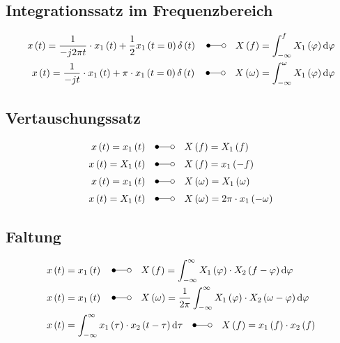 \subsection*{Integrationssatz im Frequenzbereich}
\begin{align*}
x\left(t\right) =\frac{1}{-j2\pi t}\cdot x_1\left(t\right)+\frac{1}{2}x_1\left(t=0\right)\delta\left(t\right) \quad \Laplace \quad X\left(f\right) =\int_{-\infty}^{f}X_1\left(\varphi\right)\diff \varphi\\
x\left(t\right) =\frac{1}{-j t}\cdot x_1\left(t\right)+\pi\cdot x_1\left(t=0\right)\delta\left(t\right) \quad \Laplace \quad X\left(\omega\right) =\int_{-\infty}^{\omega}X_1\left(\varphi\right)\diff \varphi
\end{align*}

\subsection*{Vertauschungssatz}
\begin{align*}
x\left(t\right) =x_1\left(t\right) \quad &\Laplace \quad X\left(f\right) =X_1\left(f\right)\\
x\left(t\right) =X_1\left(t\right) \quad &\Laplace \quad X\left(f\right) =x_1\left(-f\right)\\
x\left(t\right) =x_1\left(t\right) \quad &\Laplace \quad X\left(\omega\right)
=X_1\left(\omega\right)\\
x\left(t\right) =X_1\left(t\right) \quad &\Laplace \quad X\left(\omega\right) =2\pi\cdot
x_1\left(-\omega\right)
\end{align*}

\subsection*{Faltung}
\begin{align*}
&x\left(t\right) =x_1\left(t\right) \quad \Laplace \quad X\left(f\right) =\int_{-\infty}^\infty
X_1\left(\varphi\right)\cdot X_2\left(f-\varphi\right)\diff \varphi\\
&x\left(t\right) =x_1\left(t\right) \quad \Laplace \quad X\left(\omega\right)
=\frac{1}{2\pi}\int_{-\infty}^\infty X_1\left(\varphi\right)\cdot X_2\left(\omega-\varphi\right)\diff \varphi\\
&x\left(t\right) =\int_{-\infty}^\infty x_1\left(\tau\right)\cdot x_2\left(t-\tau\right)\diff \tau 
\quad \Laplace \quad X\left(f\right) =x_1\left(f\right)\cdot x_2\left(f\right)
\end{align*}

